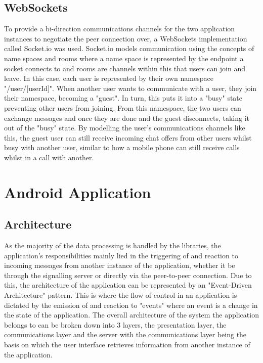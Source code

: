 \documentclass[]{report}
\begin{document}
			\subsection{WebSockets}
			To provide a bi-direction communications channels for the two application instances to negotiate the peer connection over, a WebSockets implementation called Socket.io was used. Socket.io models communication using the concepts of name spaces and rooms where a name space is represented by the endpoint a socket connects to and rooms are channels within this that users can join and leave. In this case, each user is represented by their own namespace "/user/[userId]". When another user wants to communicate with a user, they join their namespace, becoming a "guest". In turn, this puts it into a "busy" state preventing other users from joining. From this namespace, the two users can exchange messages and once they are done and the guest disconnects, taking it out of the "busy" state. By modelling the user's communications channels like this, the guest user can still receive incoming chat offers from other users whilst busy with another user, similar to how a mobile phone can still receive calls whilst in a call with another. 
			
		\section{Android Application}
			
			\subsection{Architecture}
			As the majority of the data processing is handled by the libraries, the application's responsibilities mainly lied in the triggering of and reaction to incoming messages from another instance of the application, whether it be through the signalling server or directly via the peer-to-peer connection. Due to this, the architecture of the application can be represented by an "Event-Driven Architecture" pattern. This is where the flow of control in an application is dictated by the emission of and reaction to "events" where an event is a change in the state of the application. The overall architecture of the system the application belongs to can be broken down into 3 layers, the presentation layer, the communications layer and the server with the communications layer being the basis on which the user interface retrieves information from another instance of the application.
			
\end{document}
